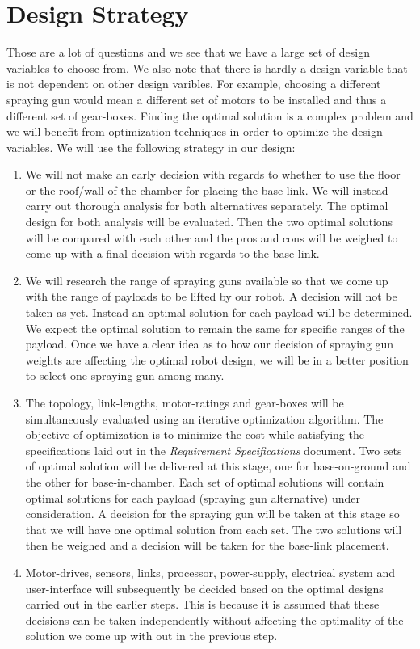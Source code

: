 \documentclass[a4paper,10pt]{article}
\begin{document}
\section{Design Strategy}
Those are a lot of questions and we see that we have a large set of design variables to choose from. We also note
that there is hardly a design variable that is not dependent on other design varibles. For example, choosing a different
spraying gun would mean a different set of motors to be installed and thus a different set of gear-boxes. Finding the optimal solution
is a complex problem and we will benefit from optimization techniques in order to optimize the design variables. We will use the
following strategy in our design:
\begin{enumerate}
 \item We will not make an early decision with regards to whether to use the floor or the roof/wall of the chamber for placing the base-link. We will instead carry 
 out thorough analysis for both alternatives separately. The optimal design for both analysis will be evaluated. Then the two optimal solutions will be compared
 with each other and the pros and cons will be weighed to come up with a final decision with regards to the base link.
 \item We will research the range of spraying guns available so that we come up with the range of payloads to be lifted by our robot. A decision will not be taken
 as yet. Instead an optimal solution for each payload will be determined. We expect the optimal solution to remain the same for specific ranges of the payload.
 Once we have a clear idea as to how our decision of spraying gun weights are affecting the optimal robot design, we will be in a better position to select one
 spraying gun among many.
 \item The topology, link-lengths, motor-ratings and gear-boxes will be simultaneously evaluated using an iterative optimization algorithm. The objective of optimization
 is to minimize the cost while satisfying the specifications laid out in the \emph{Requirement Specifications} document. Two sets of optimal solution
 will be delivered at this stage, one for base-on-ground and the other for base-in-chamber. Each set of optimal solutions will contain optimal solutions for 
 each payload (spraying gun alternative) under consideration. A decision for the spraying gun will be taken at this stage so that we will have one optimal 
 solution from each set. The two solutions will then be weighed and a decision will be taken for the base-link placement.
 \item Motor-drives, sensors, links, processor, power-supply, electrical system and user-interface will subsequently be decided based on the optimal designs 
 carried out in the earlier steps. This is because it is assumed that these decisions can be taken independently without affecting the optimality of the solution we come up with
 out in the previous step.
\end{enumerate}
\end{document}
